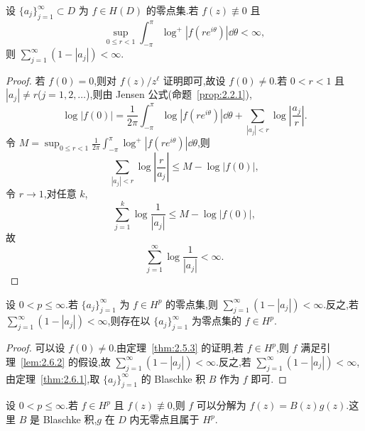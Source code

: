 \begin{lemma}\label{lem:2.6.2}
设 $\{a_{j}\}_{j=1}^{\infty} \subset D$ 为 $f \in H(D)$ 的零点集.若 $f(z) \not\equiv 0$ 且
\begin{equation*}
\sup_{0 \leq r < 1}\int_{-\pi}^{\pi}\log^{+}|f(re^{i\theta})|\dd\theta < \infty,
\end{equation*}
则 $\sum_{j=1}^{\infty}(1 - |a_{j}|) < \infty$.
\end{lemma}

\begin{proof}
若 $f(0) = 0$,则对 $f(z)/z^{\ell}$ 证明即可,故设 $f(0) \neq 0$.若 $0 < r < 1$ 且 $|a_{j}| \neq r$($j = 1, 2, \ldots$),则由 Jensen 公式(命题~\ref{prop:2.2.1}),
\begin{equation*}
\log|f(0)| = \frac{1}{2\pi}\int_{-\pi}^{\pi}\log|f(re^{i\theta})|\dd\theta + \sum_{|a_{j}| < r}\log\left|\frac{a_{j}}{r}\right|.
\end{equation*}
令 $M = \sup_{0 \leq r < 1}\frac{1}{2\pi}\int_{-\pi}^{\pi}\log^{+}|f(re^{i\theta})|\dd\theta$,则
\begin{equation*}
\sum_{|a_{j}| < r}\log\left|\frac{r}{a_{j}}\right| \leq M - \log|f(0)|,
\end{equation*}
令 $r \to 1$,对任意 $k$,
\begin{equation*}
\sum_{j = 1}^{k}\log\frac{1}{|a_{j}|} \leq M - \log|f(0)|,
\end{equation*}
故
\begin{equation*}
\sum_{j = 1}^{\infty}\log\frac{1}{|a_{j}|} < \infty.
\end{equation*}
\end{proof}

\begin{theorem}\label{thm:2.6.3}
设 $0 < p \leq \infty$.若 $\{a_{j}\}_{j=1}^{\infty}$ 为 $f \in H^{p}$ 的零点集,则 $\sum_{j=1}^{\infty}(1 - |a_{j}|) < \infty$.反之,若 $\sum_{j=1}^{\infty}(1 - |a_{j}|) < \infty$,则存在以 $\{a_{j}\}_{j=1}^{\infty}$ 为零点集的 $f \in H^{p}$.
\end{theorem}

\begin{proof}
可以设 $f(0) \neq 0$.由定理~\ref{thm:2.5.3} 的证明,若 $f \in H^{p}$,则 $f$ 满足引理~\ref{lem:2.6.2} 的假设,故 $\sum_{j=1}^{\infty}(1 - |a_{j}|) < \infty$.反之,若 $\sum_{j=1}^{\infty}(1 - |a_{j}|) < \infty$,由定理~\ref{thm:2.6.1},取 $\{a_{j}\}_{j=1}^{\infty}$ 的 Blaschke 积 $B$ 作为 $f$ 即可.
\end{proof}

\begin{theorem}\label{thm:2.6.4}
设 $0 < p \leq \infty$.若 $f \in H^{p}$ 且 $f(z) \not\equiv 0$,则 $f$ 可以分解为 $f(z) = B(z)g(z)$.这里 $B$ 是 Blaschke 积,$g$ 在 $D$ 内无零点且属于 $H^{p}$.
\end{theorem}

